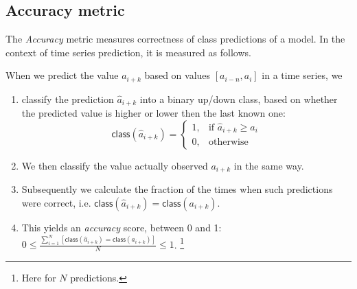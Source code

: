 \subsection{Accuracy metric}
The \emph{Accuracy} metric measures correctness of class predictions of a model. In the context of time series prediction, it is measured as follows.

When we predict the value \(a_{i+k}\) based on values \([a_{i-n}, a_i]\) in a time series, we
\begin{enumerate}
	\item classify the prediction \(\hat{a}_{i+k}\) into a binary up/down class, based on whether the predicted value is higher or lower then the last known one:
	      \[
		      \mathsf{class}(\hat{a}_{i+k}) =
		      \begin{cases}
			      1, & \text{if } \hat{a}_{i+k} \ge a_i \\
			      0, & \text{otherwise}
		      \end{cases}
	      \]
	\item We then classify the value actually observed \(a_{i+k}\) in the same way.
	\item Subsequently we calculate the fraction of the times when such predictions were correct, i.e. \(\mathsf{class}(\hat{a}_{i+k}) = \mathsf{class}(a_{i+k})\).
	\item This yields an \emph{accuracy} score, between 0 and 1: \(0 \leq \frac{\sum_{i=1}^N[\mathsf{class}(\hat{a}_{i+k}) = \mathsf{class}(a_{i+k})]}{N} \leq 1\). \footnote{Here for \(N\) predictions.}
\end{enumerate}

























